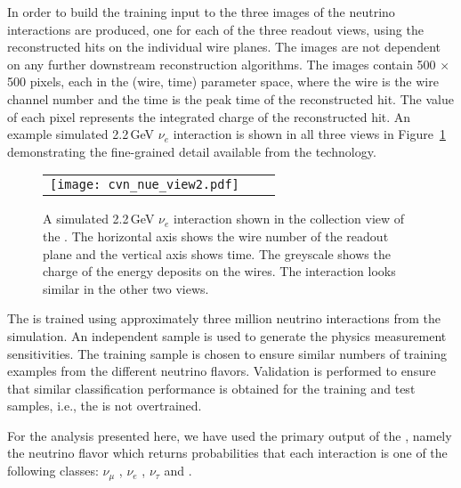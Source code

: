 In order to build the training input to the   three images of the neutrino interactions are produced, one for each of the three readout views, using the reconstructed hits on the individual wire planes. The images are not dependent on any further downstream reconstruction algorithms. The images contain 500 $\times$ 500 pixels, each in the (wire, time) parameter space, where the wire is the wire channel number and the time is the peak time of the reconstructed hit. 
The value of each pixel represents the integrated charge of the reconstructed hit. An example simulated 2.2\,GeV $\nu_{e}$  interaction is shown in all three views in Figure~\ref{fig:views} demonstrating the fine-grained detail available from the  technology.

\begin{figure}[htb] 
\centering
	\begin{tabular}{ccc}
		\texttt{[image: cvn\_nue\_view2.pdf]}
    \end{tabular}

\caption[A simulated \SI{2.2}{GeV} \nue CC interaction viewed by collection wires in the SP \lartpc]{A simulated 2.2\,GeV $\nu_{e}$  interaction shown in the collection view of the  . The horizontal axis shows the wire number of the readout plane and the vertical axis shows time. The greyscale shows the charge of the energy deposits on the wires. The interaction looks similar in the other two views.}
	\label{fig:views}
\end{figure}



The  is trained using approximately three million neutrino interactions from the  simulation. An independent sample is used to generate the physics measurement sensitivities. The training sample is chosen to ensure similar numbers of training examples from the different neutrino flavors. Validation is performed to ensure that similar classification performance is obtained for the training and test samples, i.e., the  is not overtrained.



For the analysis presented here, we have used the primary output of the , namely the neutrino flavor which returns probabilities that each interaction is one of the following classes: $\nu_{\mu}$ , $\nu_{e}$ , $\nu_{\tau}$  and . 


